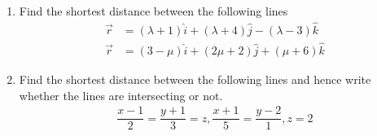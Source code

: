 \begin{enumerate}
	\item Find the shortest distance between the following lines
		\begin{align}
			\vec{r}&=(\lambda+1)\hat{i}+(\lambda+4)\hat{j}-(\lambda-3)\hat{k}\\\vec{r}&=(3-\mu)\hat{i}+(2\mu+2)\hat{j}+(\mu+6)\hat{k}
		\end{align}
	
	\item Find the shortest distance between the following lines and hence write whether the lines are intersecting or not.
		\begin{align}
			\dfrac{x-1}{2}=\dfrac{y+1}{3}=z, \dfrac{x+1}{5}=\dfrac{y-2}{1}, z=2
		\end{align}
\end{enumerate}
%
